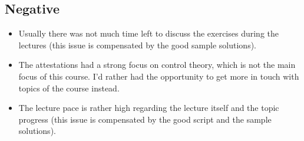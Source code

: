 \subsection{Negative}
\begin{itemize}
	\item Usually there was not much time left to discuss the exercises
		during the lectures (this issue is compensated by the good
		sample solutions).
	\item The attestations had a strong focus on control theory, which is not
		the main focus of this course. I'd rather had the opportunity to
		get more in touch with topics of the course instead.
	\item The lecture pace is rather high regarding the lecture itself and the 
		topic progress (this issue is compensated by the good script
		and the sample solutions).
\end{itemize}
